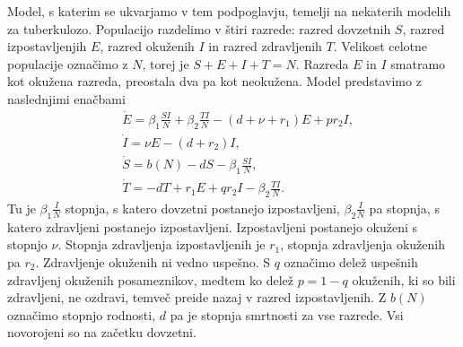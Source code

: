 \documentclass[a4paper,12pt]{article}
\begin{document}
Model, s katerim se ukvarjamo v tem podpoglavju, temelji na nekaterih modelih 
za tuberkulozo. Populacijo razdelimo v štiri razrede: razred dovzetnih \(S\), 
razred izpostavljenjih \(E\), razred okuženih \(I\) in razred zdravljenih \(T\). 
Velikost celotne populacije označimo z \(N\), torej je \(S+E+I+T=N\). Razreda \(E\) 
in \(I\) smatramo kot okužena razreda, preostala dva pa kot neokužena. 
Model predstavimo z naslednjimi enačbami
\begin{align*}
&\dot{E}=\beta_1\frac{SI}{N}+\beta_2\frac{TI}{N}-(d+\nu+r_1)E+pr_2I,\\
&\dot{I}=\nu E -(d+r_2)I,\\
&\dot{S}=b(N)-dS-\beta_1\frac{SI}{N},\\
&\dot{T}=-dT+r_1E+qr_2I-\beta_2\frac{TI}{N}.
\end{align*}
Tu je \(\beta_1\frac{I}{N}\) stopnja, s katero dovzetni postanejo izpostavljeni, 
\(\beta_2\frac{I}{N}\) pa stopnja, s katero zdravljeni postanejo izpostavljeni. 
Izpostavljeni postanejo okuženi s stopnjo \(\nu\). Stopnja zdravljenja izpostavljenih 
je \(r_1\), stopnja zdravljenja okuženih pa \(r_2\). Zdravljenje okuženih ni vedno uspešno. 
S \(q\) označimo delež uspešnih zdravljenj okuženih posameznikov, medtem ko delež \(p=1-q\) 
okuženih, ki so bili zdravljeni, ne ozdravi, temveč preide nazaj v razred izpostavljenih. 
Z \(b(N)\) označimo stopnjo rodnosti, \(d\) pa je stopnja smrtnosti za vse razrede. Vsi novorojeni 
so na začetku dovzetni. 
\end{document}
